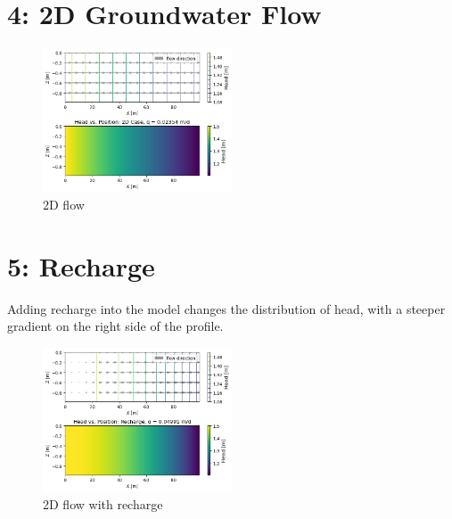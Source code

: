 \documentclass{article}
\begin{document}
\section*{4: 2D Groundwater Flow}
\begin{figure}[H]
    \centering
    \includegraphics[width=0.5\textwidth]{model_runs/2d_case.png}
    \caption{2D flow}
\end{figure}
\section*{5: Recharge}
Adding recharge into the model changes the distribution of head, with a steeper gradient on the right side of the profile.
\begin{figure}[H]
    \centering
    \includegraphics[width=0.5\textwidth]{model_runs/2d_recharge.png}
    \caption{2D flow with recharge}
\end{figure}
\end{document}
